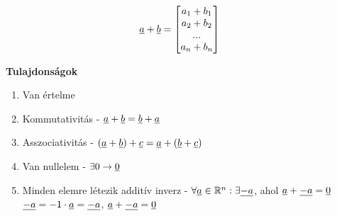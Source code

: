   \begin{frame}  
  
	\begin{tcolorbox}[title={Def.: Összeadás}]	
		\begin{align}
			\underline{a} + \underline{b} &= \begin{bmatrix}
				a_1 + b_1 \\
				a_2 + b_2 \\
				... \\
				a_n + b_n
			\end{bmatrix}
		\end{align}
				
		\tcblower
		
		\textbf{Tulajdonságok} \\
		
		\msmallskip
		
		\begin{enumerate}
			\item Van értelme
			\item Kommutativitás - $\underline{a} + \underline{b} = \underline{b} + \underline{a}$
			\item Asszociativitás - $(\underline{a} + \underline{b}) + \underline{c} = \underline{a} + (\underline{b} + \underline{c})$
			\item Van nullelem - ${\exists}0 \rightarrow \underline{0}$
			\item Minden elemre létezik additív inverz - ${\forall}\underline{a} \in \mathbb{R}^n : {\exists}\underline{-a}$, ahol $\underline{a} + \underline{-a} = \underline{0}$ \\
			$\underline{-a} = -1 \cdot \underline{a} = \underline{-a}$, $\underline{a} + \underline{-a} = \underline{0}$
		\end{enumerate}				
	\end{tcolorbox}

  \end{frame}
  
